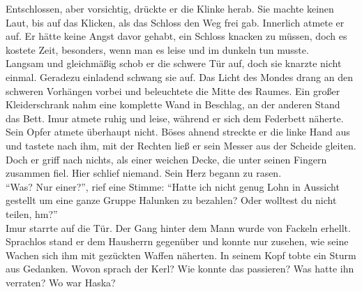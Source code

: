 Entschlossen, aber vorsichtig, drückte er die Klinke herab. Sie machte keinen Laut, bis auf das 
Klicken, als das Schloss den Weg frei gab. Innerlich atmete er auf. Er hätte keine Angst davor 
gehabt, ein Schloss knacken zu müssen, doch es kostete Zeit, besonders, wenn man es leise und im 
dunkeln tun musste.\\
Langsam und gleichmäßig schob er die schwere Tür auf, doch sie knarzte nicht einmal. Geradezu 
einladend schwang sie auf. Das Licht des Mondes drang an den schweren Vorhängen vorbei und 
beleuchtete die Mitte des Raumes. Ein großer Kleiderschrank nahm eine komplette Wand in Beschlag, 
an der anderen Stand das Bett. Imur atmete ruhig und leise, während er sich dem Federbett näherte. 
Sein Opfer atmete überhaupt nicht. Böses ahnend streckte er die linke Hand aus und tastete nach 
ihm, mit der Rechten ließ er sein Messer aus der Scheide gleiten.
Doch er griff nach nichts, als einer weichen Decke, die unter seinen Fingern zusammen fiel.
Hier schlief niemand. Sein Herz begann zu rasen.\\
``Was? Nur einer?'', rief eine Stimme: ``Hatte ich nicht genug Lohn in Aussicht gestellt um eine 
ganze Gruppe Halunken zu bezahlen? Oder wolltest du nicht teilen, hm?''\\
Imur starrte auf die Tür. Der Gang hinter dem Mann wurde von Fackeln erhellt. Sprachlos stand er 
dem Hausherrn gegenüber und konnte nur zusehen, wie seine Wachen sich ihm mit gezückten Waffen 
näherten. In seinem Kopf tobte ein Sturm aus Gedanken. Wovon sprach der Kerl? Wie konnte das 
passieren? Was hatte ihn verraten? Wo war Haska?\\


